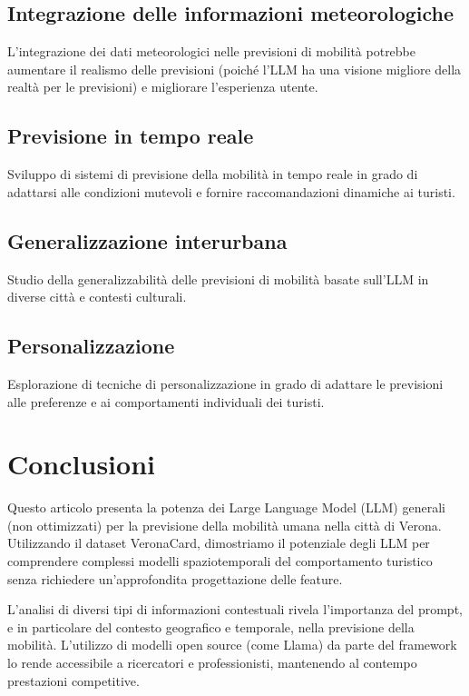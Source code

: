 \documentclass[12pt,a4paper]{article}
\begin{document}
\subsection{Integrazione delle informazioni meteorologiche}
L'integrazione dei dati meteorologici nelle previsioni di mobilità potrebbe aumentare il realismo delle previsioni (poiché l'LLM ha una visione migliore della realtà per le previsioni) e migliorare l'esperienza utente.

\subsection{Previsione in tempo reale}
Sviluppo di sistemi di previsione della mobilità in tempo reale in grado di adattarsi alle condizioni mutevoli e fornire raccomandazioni dinamiche ai turisti.

\subsection{Generalizzazione interurbana}
Studio della generalizzabilità delle previsioni di mobilità basate sull'LLM in diverse città e contesti culturali.

\subsection{Personalizzazione}
Esplorazione di tecniche di personalizzazione in grado di adattare le previsioni alle preferenze e ai comportamenti individuali dei turisti.

\newpage

\section{Conclusioni}

Questo articolo presenta la potenza dei Large Language Model (LLM) generali (non ottimizzati) per la previsione della mobilità umana nella città di Verona.
Utilizzando il dataset VeronaCard, dimostriamo il potenziale degli LLM per comprendere complessi modelli spaziotemporali del comportamento turistico senza richiedere un'approfondita progettazione delle feature.

L'analisi di diversi tipi di informazioni contestuali rivela l'importanza del prompt, e in particolare del contesto geografico e temporale, nella previsione della mobilità. L'utilizzo di modelli open source (come Llama) da parte del framework lo rende accessibile a ricercatori e professionisti, mantenendo al contempo prestazioni competitive.
\end{document}
